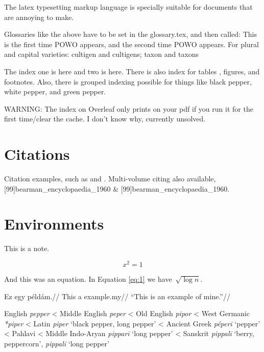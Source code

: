The \gls{latex} typesetting markup language is specially suitable 
for documents that are annoying to make.

Glossaries like the above have to be set in the glossary.tex, and then called:
This is the first time \gls{POWO} appears, and the second time \gls{POWO} appears. For plural and capital varieties:
\gls{cultigen} and \glspl{cultigen}; \Gls{taxon} and \Glspl{taxon}

\bigskip

The index one is here and two is here. There is also index for tables , figures, and footnotes.
Also, there is grouped indexing possible for things like black pepper, white pepper, and green pepper. 

WARNING: The index on Overleaf only prints on your pdf if you run it for the first time/clear the cache. I don't know why, currently unsolved.

\section{Citations}

Citation examples, such as \parencite[99]{huang_routledge_2019} and \textcite{huang_routledge_2019}. 
Multi-volume citing also available, [99]{bearman_encyclopaedia_1960} \& [99]{bearman_encyclopaedia_1960}.

\section{Environments}

\begin{note}
    This is a note.
\end{note}

\begin{equation}
    \label{eq:1}
    x^2  = 1
\end{equation}

And this was an equation. In Equation \ref{eq:1} we have~$\sqrt{\log n}$.

\ex
\begingl
\gla{}Ez egy példám.//
\glb This a example.my//
\glft ``This is an example of mine.''//
\endgl
\xe




\begin{etymology}\label{etym:pepper}
\raggedright
English \textit{pepper}
< Middle English \textit{peper}
< Old English \textit{pipor}
< West Germanic \textit{*piper}
< Latin \textit{piper} `black pepper, long pepper'
< Ancient Greek \textit{péperi} `pepper'
< Pahlavi
< Middle Indo-Aryan \textit{pipparī} `long pepper'
< Sanskrit \textit{pippalī} `berry, peppercorn', \textit{pippali} `long pepper'
\end{etymology}

